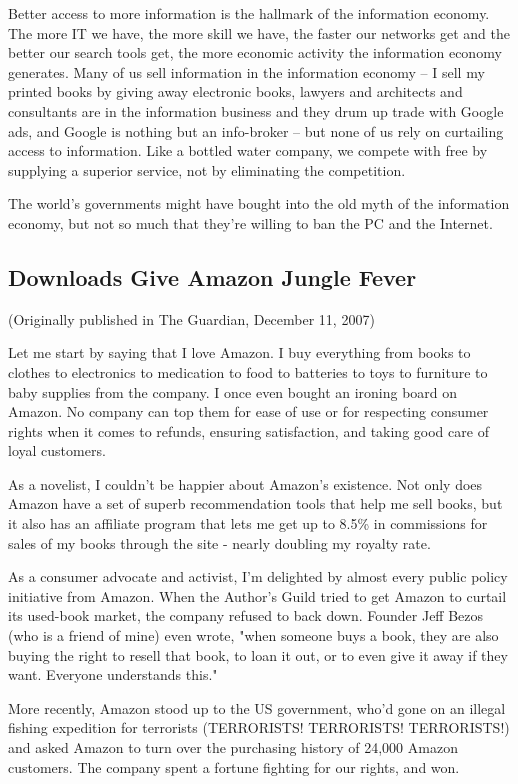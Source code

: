 Better access to more information is the hallmark of the
information economy. The more IT we have, the more skill we have,
the faster our networks get and the better our search tools get,
the more economic activity the information economy generates. Many
of us sell information in the information economy -- I sell my
printed books by giving away electronic books, lawyers and
architects and consultants are in the information business and they
drum up trade with Google ads, and Google is nothing but an
info-broker -- but none of us rely on curtailing access to
information. Like a bottled water company, we compete with free by
supplying a superior service, not by eliminating the competition.

The world's governments might have bought into the old myth of the
information economy, but not so much that they're willing to ban
the PC and the Internet.

\subsection{Downloads Give Amazon Jungle Fever}

(Originally published in The Guardian, December 11, 2007)

Let me start by saying that I love Amazon. I buy everything from
books to clothes to electronics to medication to food to batteries
to toys to furniture to baby supplies from the company. I once even
bought an ironing board on Amazon. No company can top them for ease
of use or for respecting consumer rights when it comes to refunds,
ensuring satisfaction, and taking good care of loyal customers.

As a novelist, I couldn't be happier about Amazon's existence. Not
only does Amazon have a set of superb recommendation tools that
help me sell books, but it also has an affiliate program that lets
me get up to 8.5\% in commissions for sales of my books through the
site - nearly doubling my royalty rate.

As a consumer advocate and activist, I'm delighted by almost every
public policy initiative from Amazon. When the Author's Guild tried
to get Amazon to curtail its used-book market, the company refused
to back down. Founder Jeff Bezos (who is a friend of mine) even
wrote, "when someone buys a book, they are also buying the right to
resell that book, to loan it out, or to even give it away if they
want. Everyone understands this."

More recently, Amazon stood up to the US government, who'd gone on
an illegal fishing expedition for terrorists (TERRORISTS!
TERRORISTS! TERRORISTS!) and asked Amazon to turn over the
purchasing history of 24,000 Amazon customers. The company spent a
fortune fighting for our rights, and won.


